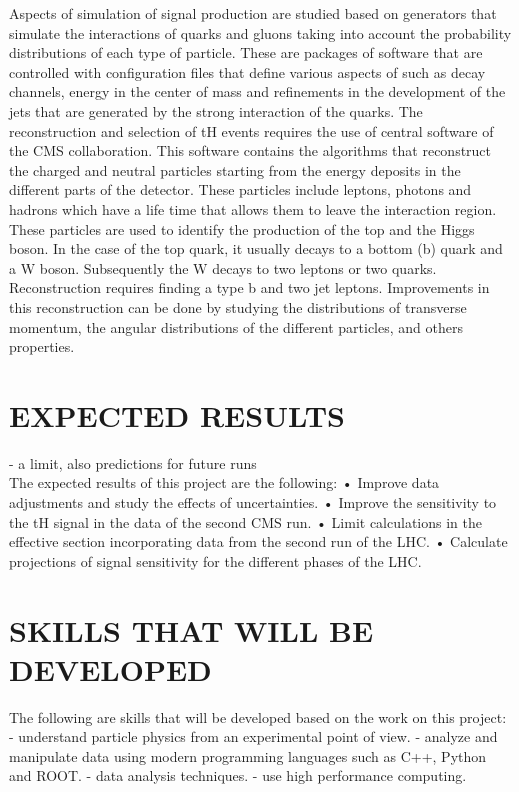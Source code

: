 \documentclass[final,3p]{CSP}
\begin{document}
Aspects of simulation of signal production are studied based on generators that simulate the 
interactions of quarks and gluons taking into account the probability distributions of each 
type of particle. These are packages of software that are controlled with configuration files 
that define various aspects of such as decay channels, energy in the center of mass and 
refinements in the development of the jets that are generated by the strong interaction of 
the quarks. The reconstruction and selection of tH events requires the use of central 
software of the CMS collaboration. This software contains the algorithms that reconstruct the 
charged and neutral particles starting from the energy deposits in the different parts of the 
detector. These particles include leptons, photons and hadrons which have a life time that 
allows them to leave the interaction region. These particles are used to identify the 
production of the top and the Higgs boson. In the case of the top quark, it usually decays to 
a bottom (b) quark and a W boson. Subsequently the W decays to two leptons or two quarks. 
Reconstruction requires finding a type b and two jet leptons. Improvements in this 
reconstruction can be done by studying the distributions of transverse momentum, the angular 
distributions of the different particles, and others properties.

\section{EXPECTED RESULTS}
- a limit, also predictions for future runs\\

The expected results of this project are the following:
• Improve data adjustments and study the effects of uncertainties.
• Improve the sensitivity to the tH signal in the data of the second CMS run.
• Limit calculations in the effective section incorporating data from the second
run of the LHC.
• Calculate projections of signal sensitivity for the different phases of the LHC.


\cleardoublepage



\appendix
\section{SKILLS THAT WILL BE DEVELOPED}
The following are skills that will be developed based on the work on this project:
- understand particle physics from an experimental point of view.
- analyze and manipulate data using modern programming languages such as C++, Python and ROOT.
- data analysis techniques.
- use high performance computing.
\end{document}
